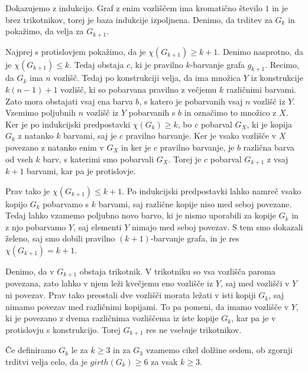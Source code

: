 \documentclass[mat1, tisk]{fmfdelo}
\begin{document}
    \begin{dokaz}
        Dokazujemo z indukcijo. Graf z enim vozliščem ima kromatično število $1$ in je brez trikotnikov, torej je baza indukcije izpoljnena. 
        Denimo, da trditev za $G_k$ in pokažimo, da velja za $G_{k+1}$.

        Najprej s protislovjem pokažimo, da je $\chi(G_{k+1}) \geq k + 1$. Denimo nasprotno, da je $\chi(G_{k+1}) \leq k$. Tedaj obstaja $c$, 
        ki je pravilno $k$-barvanje grafa $g_{k+1}$. Recimo, da $G_k$ ima $n$ vozlišč. Tedaj po konstrukciji velja, da ima množica $Y$ iz 
        konstrukcije $k(n - 1) + 1$ vozlišč, ki so pobarvana pravilno z večjemu $k$ različnimi barvami. Zato mora obstajati vsaj ena barva 
        $b$, s katero je pobarvanih vsaj $n$ vozlišč iz $Y$. Vzemimo poljubnih $n$ vozlišč iz $Y$ pobarvanih s $b$ in označimo to množico 
        z $X$. Ker je po indukcijski predpostavki $\chi(G_k) \geq k$, bo $c$ pobarval $G_X$, ki je kopija $G_k$ z natanko $k$ barvami, saj 
        je $c$ pravilno barvanje. Ker je vsako vozlišče v $X$ povezano z natanko enim v $G_X$ in ker je $c$ pravilno barvanje, je $b$ različna
        barva od vseh $k$ barv, s katerimi smo pobarvali $G_X$. Torej je $c$ pobarval $G_{k+1}$ z vsaj $k + 1$ barvami, kar pa je protislovje.

        Prav tako je $\chi(G_{k+1}) \leq k + 1$. Po indukcijski predpostavki lahko namreč vsako kopijo $G_k$ pobarvamo s $k$ barvami, saj različne
        kopije niso med seboj povezane. Tedaj lahko vzamemo poljubno novo barvo, ki je nismo uporabili za kopije $G_k$ in z njo pobarvamo $Y$,
        saj elementi $Y$ nimajo med seboj povezav. S tem smo dokazali želeno, saj smo dobili pravilno $(k+1)$-barvanje grafa, in je res 
        $\chi(G_{k+1}) = k + 1$.

        Denimo, da v $G_{k+1}$ obstaja trikotnik. V trikotniku so vsa vozlišča paroma povezana, zato lahko v njem leži kvečjemu eno vozlišče iz $Y$,
        saj med vozlišči v $Y$ ni povezav. Prav tako preostali dve vozlišči morata ležati v isti kopiji $G_k$, saj nimamo povezav med različnimi kopijami.
        To pa pomeni, da imamo vozlišče v $Y$, ki je povezano z dvema različnima vozliščema iz iste kopije $G_k$, kar pa je v protislovju s konstrukcijo.
        Torej $G_{k+1}$ res ne vsebuje trikotnikov.

    \end{dokaz}

    \begin{opomba}
        Če definiramo $G_k$ le za $k \geq 3$ in za $G_3$ vzamemo cikel dolžine sedem, ob zgornji trditvi velja celo, da je $girth(G_k) \geq 6$ za vsak 
        $k \geq 3$.
    \end{opomba}
\end{document}
